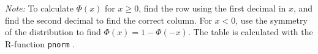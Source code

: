 \documentclass[10pt]{article}
\begin{document}
\begin{table}
    \medskip
    \emph{Note:} To calculate $\Phi(x)$ for $x\geq0$, find the row using the
    first decimal in $x$, and find the second decimal to find the correct
    column. For $x<0$, use the symmetry of the distribution to find  $\Phi(x) =
    1-\Phi(-x)$. The table is calculated with the R-function \texttt{pnorm} \citep{R2023}.
\end{table}
\end{document}
